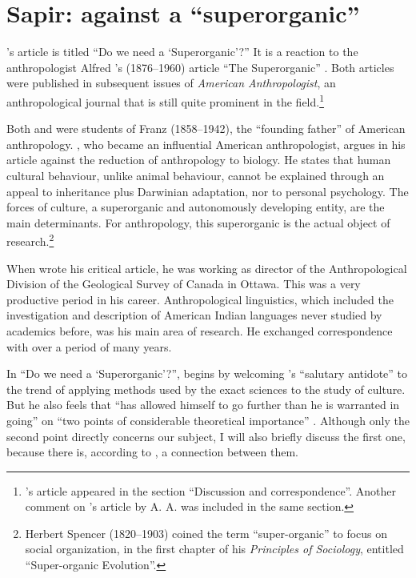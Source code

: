 \documentclass[output=paper]{langscibook}
\begin{document}
\section{Sapir: against a ``superorganic''}
\label{sec:elffers:superorganic}

{\Sapir}'s \citeyear{Sapir1917} article is titled ``Do we need a `Superorganic'?'' It is a reaction to the anthropologist Alfred {\Kroeber}'s (1876--1960) article ``The Superorganic'' \citep{Kroeber1917}. Both articles were published in subsequent issues of \emph{American Anthropologist}, an anthropological journal that is still quite prominent in the field.\footnote{{\Sapir}'s article appeared in the section ``Discussion and correspondence''. Another comment on {\Kroeber}'s article by A. A. \citet{Goldenweiser1917} was included in the same section.}

Both {\Kroeber} and {\Sapir} were students of Franz {\Boas} (1858--1942), the ``founding father'' of American anthropology. {\Kroeber}, who became an influential American anthropologist, argues in his \citeyear{Kroeber1917} article against the reduction of anthropology to biology. He states that human cultural behaviour, unlike animal behaviour, cannot be explained through an appeal to inheritance plus Darwinian adaptation, nor to personal psychology. The forces of culture, a superorganic and autonomously developing entity, are the main determinants. For anthropology, this superorganic is the actual object of research.\footnote{Herbert Spencer (1820--1903) coined the term ``super-organic'' to focus on social organization, in the first chapter of his \citeyear{Spencer1898} \emph{Principles of Sociology}, entitled ``Super-organic Evolution''.}

When {\Sapir} wrote his critical article, he was working as director of the Anthropological Division of the Geological Survey of Canada in Ottawa. This was a very productive period in his career. Anthropological linguistics, which included the investigation and description of American Indian languages never studied by academics before, was his main area of research. He exchanged correspondence with {\Kroeber} over a period of many years.

In ``Do we need a `Superorganic'?'', {\Sapir} begins by welcoming {\Kroeber}'s ``salutary antidote'' to the trend of applying methods used by the exact sciences to the study of culture. But he also feels that {\Kroeber} ``has allowed himself to go further than he is warranted in going'' on ``two points of considerable theoretical importance'' \citep[441]{Sapir1917}. Although only the second point directly concerns our subject, I will also briefly discuss the first one, because there is, according to {\Sapir}, a connection between them.
\end{document}
